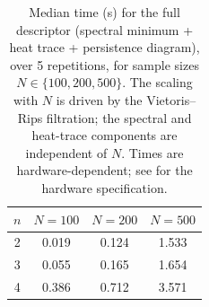 \begin{table}[htbp]\centering
\caption{Median time (s) for the full descriptor (spectral minimum + heat
trace + persistence diagram), over 5 repetitions, for sample sizes
\(N\in\{100,200,500\}\). The scaling with \(N\) is driven by the
Vietoris--Rips filtration; the spectral and heat-trace components are
independent of \(N\). Times are hardware-dependent; see
 for the hardware specification.}
\label{tab:performance}
\begin{tabular}{cccc}\hline
\(n\) & \(N = 100\) & \(N = 200\) & \(N = 500\) \\\hline
2 & 0.019 & 0.124 & 1.533 \\
3 & 0.055 & 0.165 & 1.654 \\
4 & 0.386 & 0.712 & 3.571 \\
\hline\end{tabular}\end{table}